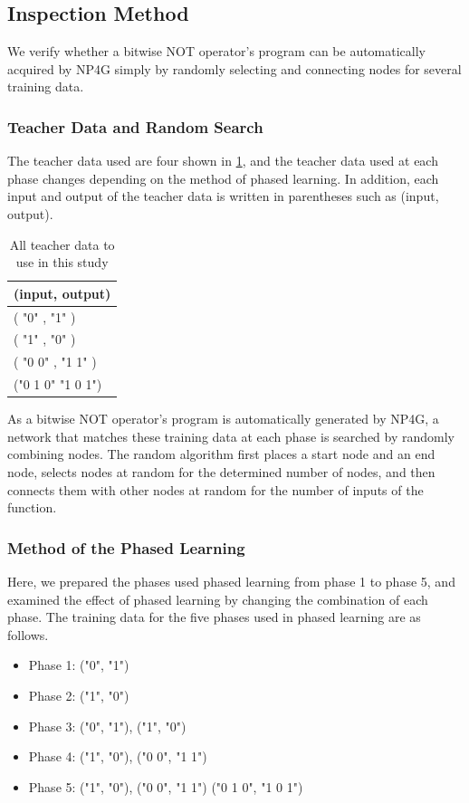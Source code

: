 \documentclass{article}
\begin{document}
\subsection {Inspection Method}
We verify whether a bitwise NOT operator's program can be automatically acquired by NP4G simply by randomly selecting and connecting nodes for several training data.

\subsubsection {Teacher Data and Random Search}
The teacher data used are four shown in \ref{tbl:TeacherData}, and the teacher data used at each phase changes depending on the method of phased learning.
In addition, each input and output of the teacher data is written in parentheses such as (input, output).

\begin{table}[htbp]
\centering
\caption {All teacher data to use in this study}
\label{tbl:TeacherData}
\begin{tabular}{l}
\hline
(input, output) \\
\hline \hline
( "0" , "1" ) \\
( "1" , "0" ) \\
( "0 0" , "1 1" ) \\
("0 1 0" "1 0 1") \\
\hline
\end{tabular}
\end{table}

As a bitwise NOT operator's program is automatically generated by NP4G, a network that matches these training data at each phase is searched by randomly combining nodes.
The random algorithm first places a start node and an end node, selects nodes at random for the determined number of nodes, and then connects them with other nodes at random for the number of inputs of the function.

\subsubsection {Method of the Phased Learning}
\label{sec:PLhow}
Here, we prepared the phases used phased learning from phase 1 to phase 5, and examined the effect of phased learning by changing the combination of each phase.
The training data for the five phases used in phased learning are as follows.

\begin{itemize}
\item Phase 1: ("0", "1")
\item Phase 2: ("1", "0")
\item Phase 3: ("0", "1"), ("1", "0")
\item Phase 4: ("1", "0"), ("0 0", "1 1")
\item Phase 5: ("1", "0"), ("0 0", "1 1") ("0 1 0", "1 0 1")
\end{itemize}
\end{document}
